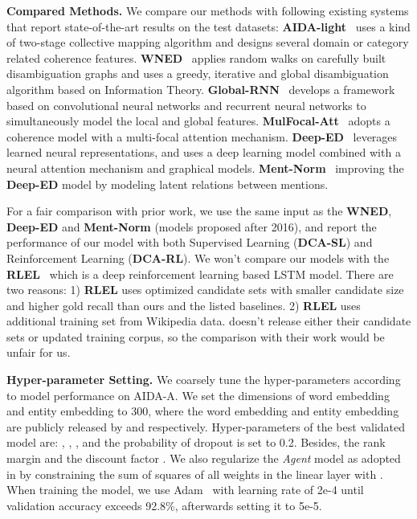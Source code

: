 \medskip
\noindent
\textbf{Compared Methods.}
We compare our methods with following existing systems that report state-of-the-art results on the test datasets: \textbf{AIDA-light}~\cite{nguyen2014aida} uses a kind of two-stage collective mapping algorithm and designs several domain or category related coherence features.
\textbf{WNED}~\cite{guo2016robust} applies random walks on carefully built disambiguation graphs and uses a greedy, iterative and global disambiguation algorithm based on Information Theory.
\textbf{Global-RNN}~\cite{nguyen2016joint} develops a framework based on convolutional neural networks and recurrent neural networks to simultaneously model the local and global features.
\textbf{MulFocal-Att}~\cite{globerson2016collective} adopts a coherence model with a multi-focal attention mechanism.
\textbf{Deep-ED}~\cite{ganea2017deep} leverages learned neural representations, and uses a deep learning model combined with a neural attention mechanism and graphical models.
\textbf{Ment-Norm}~\cite{le2018improving} improving the \textbf{Deep-ED} model by modeling latent relations between mentions.


For a fair comparison with prior work, we use the same input as the \textbf{WNED}, \textbf{Deep-ED} and \textbf{Ment-Norm} (models proposed after 2016), and report the performance of our model with both Supervised Learning (\textbf{DCA-SL}) and Reinforcement Learning (\textbf{DCA-RL}). We won't compare our models with the \textbf{RLEL}~\cite{fang2019joint} which is a deep reinforcement learning based LSTM model. There are two reasons: 1) \textbf{RLEL} uses optimized candidate sets with smaller candidate size and higher gold recall than ours and the listed baselines. 2) \textbf{RLEL} uses additional training set from Wikipedia data. \cite{fang2019joint} doesn't release either their candidate sets or updated training corpus, so the comparison with their work would be unfair for us.

\medskip
\noindent\textbf{Hyper-parameter Setting.} We coarsely tune the hyper-parameters according to model performance on AIDA-A. We set the dimensions of word embedding and entity embedding to 300, where the word embedding and entity embedding are publicly released by \cite{pennington2014glove} and  \cite{ganea2017deep} respectively. Hyper-parameters of the best validated model are: , , , and the probability of dropout is set to 0.2. Besides, the rank margin  and the discount factor . We also regularize the \emph{Agent} model as adopted in \cite{ganea2017deep} by constraining the sum of squares of all weights in the linear layer with . When training the model,  we use Adam~\cite{kingma2014adam} with learning rate of 2e-4 until validation accuracy exceeds 92.8\%, afterwards setting it to 5e-5. \\


